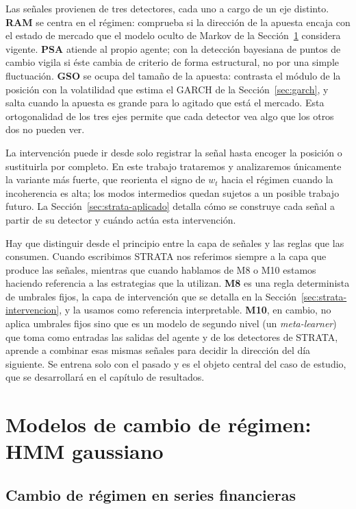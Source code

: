 Las señales provienen de tres detectores, cada uno a cargo de un eje distinto. \textbf{RAM} se centra en el régimen: comprueba si la dirección de la apuesta encaja con el estado de mercado que el modelo oculto de Markov de la Sección~\ref{sec:hmm} considera vigente. \textbf{PSA} atiende al propio agente; con la detección bayesiana de puntos de cambio vigila si éste cambia de criterio de forma estructural, no por una simple fluctuación. \textbf{GSO} se ocupa del tamaño de la apuesta: contrasta el módulo de la posición con la volatilidad que estima el GARCH de la Sección~\ref{sec:garch}, y salta cuando la apuesta es grande para lo agitado que está el mercado. Esta ortogonalidad de los tres ejes permite que cada detector vea algo que los otros dos no pueden ver.

La intervención puede ir desde solo registrar la señal hasta encoger la posición o sustituirla por completo. En este trabajo trataremos y analizaremos únicamente la variante más fuerte, que reorienta el signo de $w_t$ hacia el régimen cuando la incoherencia es alta; los modos intermedios quedan sujetos a un posible trabajo futuro. La Sección~\ref{sec:strata-aplicado} detalla cómo se construye cada señal a partir de su detector y cuándo actúa esta intervención.

Hay que distinguir desde el principio entre la capa de señales y las reglas que las consumen. Cuando escribimos STRATA nos referimos siempre a la capa que produce las señales, mientras que cuando hablamos de M8 o M10 estamos haciendo referencia a las estrategias que la utilizan. \textbf{M8} es una regla determinista de umbrales fijos, la capa de intervención que se detalla en la Sección~\ref{sec:strata-intervencion}, y la usamos como referencia interpretable. \textbf{M10}, en cambio, no aplica umbrales fijos sino que es un modelo de segundo nivel (un \emph{meta-learner}) que toma como entradas las salidas del agente y de los
detectores de STRATA, aprende a combinar esas mismas señales para decidir la dirección del
día siguiente. Se entrena solo con el pasado y es el
objeto central del caso de estudio, que se desarrollará en el capítulo de resultados.

\section{Modelos de cambio de régimen: HMM gaussiano}
\label{sec:hmm}

\subsection{Cambio de régimen en series financieras}
\label{sec:hmm-regimen}

